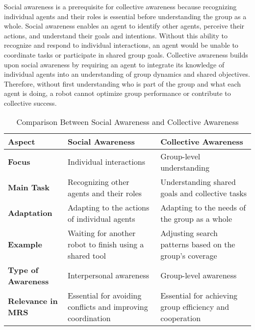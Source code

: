     Social awareness is a prerequisite for collective awareness because recognizing individual agents and their roles is essential before understanding the group as a whole. Social awareness enables an agent to identify other agents, perceive their actions, and understand their goals and intentions. Without this ability to recognize and respond to individual interactions, an agent would be unable to coordinate tasks or participate in shared group goals. Collective awareness builds upon social awareness by requiring an agent to integrate its knowledge of individual agents into an understanding of group dynamics and shared objectives. Therefore, without first understanding who is part of the group and what each agent is doing, a robot cannot optimize group performance or contribute to collective success. \cite{brambilla-2013-swarm-robotics-review}
    \begin{table}[h!]
        \centering
        \begin{tabular}{|l|l|l|}
            \hline
            \textbf{Aspect}              & \textbf{Social Awareness}                                      & \textbf{Collective Awareness}                                   \\ \hline
            \textbf{Focus}               & Individual interactions                                        & Group-level understanding                                        \\ \hline
            \textbf{Main Task}           & Recognizing other agents and their roles                       & Understanding shared goals and collective tasks                  \\ \hline
            \textbf{Adaptation}          & Adapting to the actions of individual agents                   & Adapting to the needs of the group as a whole                    \\ \hline
            \textbf{Example}             & Waiting for another robot to finish using a shared tool        & Adjusting search patterns based on the group’s coverage          \\ \hline
            \textbf{Type of Awareness}   & Interpersonal awareness                                        & Group-level awareness                                            \\ \hline
            \textbf{Relevance in MRS}    & Essential for avoiding conflicts and improving coordination     & Essential for achieving group efficiency and cooperation         \\ \hline
        \end{tabular}
        \caption{Comparison Between Social Awareness and Collective Awareness}
    \end{table}

